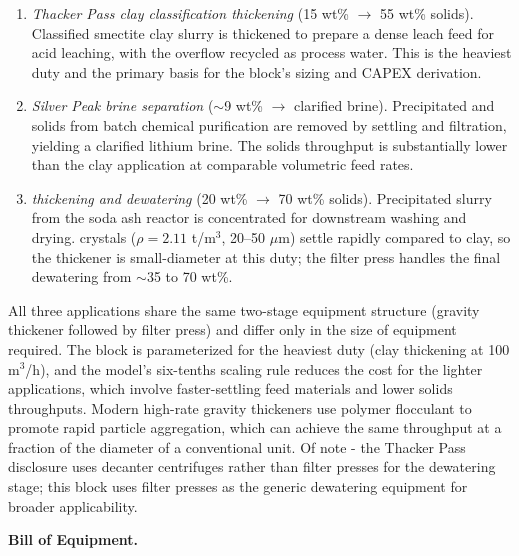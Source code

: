 \begin{enumerate}[noitemsep]
	\item \textit{Thacker Pass clay classification thickening} (15 wt\% $\rightarrow$ 55 wt\% solids). Classified smectite clay slurry is thickened to prepare a dense leach feed for acid leaching, with the overflow recycled as process water. This is the heaviest duty and the primary basis for the block's sizing and CAPEX derivation.
	\item \textit{Silver Peak brine separation} ($\sim$9 wt\% $\rightarrow$ clarified brine). Precipitated  and  solids from batch chemical purification are removed by settling and filtration, yielding a clarified lithium brine. The solids throughput is substantially lower than the clay application at comparable volumetric feed rates.
	\item \textit{ thickening and dewatering} (20 wt\% $\rightarrow$ 70 wt\% solids). Precipitated  slurry from the soda ash reactor is concentrated for downstream washing and drying.  crystals ($\rho = 2.11$ t/m$^3$, 20--50 $\mu$m) settle rapidly compared to clay, so the thickener is small-diameter at this duty; the filter press handles the final dewatering from $\sim$35 to 70 wt\%.
\end{enumerate}
 
All three applications share the same two-stage equipment structure (gravity thickener followed by filter press) and differ only in the size of equipment required. The block is parameterized for the heaviest duty (clay thickening at 100 m$^3$/h), and the model's six-tenths scaling rule reduces the cost for the lighter applications, which involve faster-settling feed materials and lower solids throughputs. Modern high-rate gravity thickeners use polymer flocculant to promote rapid particle aggregation, which can achieve the same throughput at a fraction of the diameter of a conventional unit. Of note - the Thacker Pass disclosure uses decanter centrifuges rather than filter presses for the dewatering stage; this block uses filter presses as the generic dewatering equipment for broader applicability.

\medskip
\noindent\textbf{Bill of Equipment.}\quad

